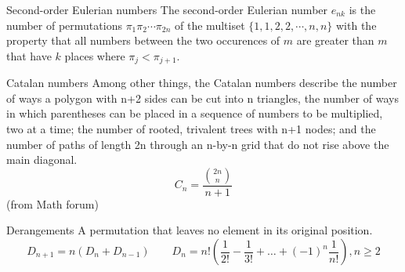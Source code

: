 \begin{algorithm}{Second-order Eulerian numbers}
\desc{}
The second-order Eulerian number $e_{nk}$ is the number of permutations $\pi_1 \pi_2 \cdots \pi_{2n}$ of the multiset $\{1,1,2,2,\cdots,n,n\}$ with the property that all numbers between the two occurences of $m$ are greater than $m$ that have $k$ places where $\pi_j < \pi_{j+1}$.  
\end{algorithm}

\begin{algorithm}{Catalan numbers}
\keyword{}
Among other things, the Catalan numbers describe the number of ways a polygon
with n+2 sides can be cut into n triangles, the number of ways in which
parentheses can be placed in a sequence of numbers to be multiplied, two at
a time; the number of rooted, trivalent trees with n+1 nodes; and the number
of paths of length 2n through an n-by-n grid that do not rise above the
main diagonal.
$$ C_n = \frac{\binom{2n}{n}}{\scriptstyle n+1} $$
(from Math forum)
\end{algorithm}

\begin{algorithm}{Derangements}
\keyword{}
A permutation that leaves no element in its original position.
$$D_{n+1}=n(D_n+D_{n-1})
\qquad
D_n=n!\left(\frac 1{2!}-\frac 1{3!}+\ldots+(-1)^n\frac 1{n!}\right), n\ge 2$$
\end{algorithm}






